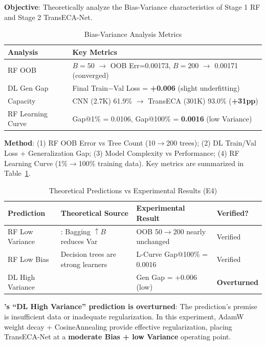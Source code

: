 \documentclass[sigconf]{acmart}
\begin{document}
\textbf{Objective}: Theoretically analyze the Bias-Variance characteristics of Stage 1 RF and Stage 2 TransECA-Net.


\begin{table}[!t]
\caption{Bias-Variance Analysis Metrics}
\label{tab:bias_variance}
\begin{tabular}{ll}
\toprule
\textbf{Analysis} & \textbf{Key Metrics} \\
\midrule
RF OOB & $B=50$ $\to$ OOB Err=0.00173, $B=200$ $\to$ 0.00171 (converged) \\
DL Gen Gap & Final Train$-$Val Loss = \textbf{+0.006} (slight underfitting) \\
Capacity & CNN (2.7K) 61.9\% $\to$ TransECA (301K) 93.0\% (\textbf{+31pp}) \\
RF Learning Curve & Gap@1\% = 0.0106, Gap@100\% = \textbf{0.0016} (low Variance) \\
\bottomrule
\end{tabular}
\end{table}
\textbf{Method}: (1) RF OOB Error vs Tree Count (10$\to$200 trees); (2) DL Train/Val Loss + Generalization Gap; (3) Model Complexity vs Performance; (4) RF Learning Curve (1\%$\to$100\% training data). Key metrics are summarized in Table~\ref{tab:bias_variance}.

\begin{table}[!t]
\caption{Theoretical Predictions vs Experimental Results (E4)}
\label{tab:e4_theory}
\begin{tabular}{p{4.0cm}p{4.0cm}p{5.4cm}p{2.4cm}}
\toprule
\textbf{Prediction} & \textbf{Theoretical Source} & \textbf{Experimental Result} & \textbf{Verified?} \\
\midrule
RF Low Variance & \cite{3}: Bagging $\uparrow B$ reduces Var & OOB 50$\to$200 nearly unchanged & Verified \\
RF Low Bias & Decision trees are strong learners & L-Curve Gap@100\% = 0.0016 & Verified \\
DL High Variance & \cite{5} & Gen Gap = +0.006 (low) & \textbf{Overturned} \\
\bottomrule
\end{tabular}
\end{table}


\textbf{\cite{5}'s ``DL High Variance'' prediction is overturned}: The prediction's premise is insufficient data or inadequate regularization. In this experiment, AdamW weight decay + CosineAnnealing provide effective regularization, placing TransECA-Net at a \textbf{moderate Bias + low Variance} operating point.
\end{document}
